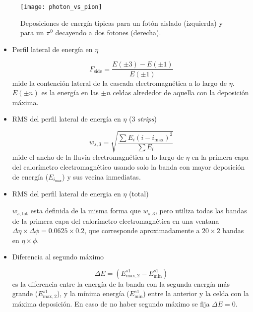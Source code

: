 \begin{figure}[!htb]
  \centering

  \texttt{[image: photon\_vs\_pion]}

  \caption{Deposiciones de energía típicas para un fotón aislado (izquierda)
    y para un $\pi^0$ decayendo a dos fotones (derecha).}
  \label{fig:photon_pi0}
\end{figure}




\begin{itemize}\itemsep0.2cm\parskip0.2cm
\item Perfil lateral de energía en $\eta$

  \begin{equation}
    F_\mathrm{side} = \frac{E(\pm 3) - E(\pm 1)}{E(\pm 1)}
  \end{equation}
  mide la contención lateral de la cascada electromagnética a lo largo de $\eta$.
  $E(\pm n)$ es la energía en las $\pm n$ celdas alrededor de aquella con la deposición máxima.

\item RMS del perfil lateral de energía en $\eta$ (3 \emph{strips})

  \begin{equation}
    w_{s,3} = \sqrt{ \frac{\sum E_i (i - i_\mathrm{max})^2}{\sum E_i} }
  \end{equation}
  mide el ancho de la lluvia electromagnética a lo largo de $\eta$ en la primera capa
  del calorímetro electromagnético usando solo la banda con mayor deposición de energía ($E_{i_\mathrm{max}}$)
  y sus vecina inmediatas.

\item RMS del perfil lateral de energia en $\eta$ (total)

  $w_{s,\mathrm{tot}}$ esta definida de la misma forma que $w_{s,3}$, pero utiliza todas las bandas de la
  primera capa del calorímetro electromagnética en una ventana $\Delta\eta \times \Delta\phi = 0.0625 \times 0.2$,
  que corresponde aproximadamente a $20 \times 2$ bandas en $\eta \times \phi$.

\item Diferencia al segundo máximo

  \begin{equation}
    \Delta E = (E^{s1}_{\mathrm{max},2} - E_\mathrm{min}^{s1} )
  \end{equation}
  es la diferencia entre la energía de la banda con la segunda energía más grande ($E^{s1}_{\mathrm{max},2}$),
  y la mínima energía ($E_\mathrm{min}^{s1}$) entre la anterior y la celda con la máxima deposición. En caso
  de no haber segundo máximo se fija $\Delta E = 0$.


\end{itemize}
